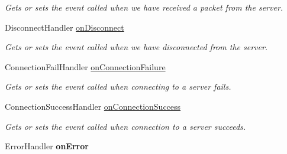 \begin{DoxyCompactItemize}
\begin{DoxyCompactList}\small\item\em Gets or sets the event called when we have received a packet from the server. \end{DoxyCompactList}\item 
\hypertarget{classSharpenguin_1_1PenguinBase_a11a9cb86a237e4aff2903c84cbc0d26f}{Disconnect\-Handler \hyperlink{classSharpenguin_1_1PenguinBase_a11a9cb86a237e4aff2903c84cbc0d26f}{on\-Disconnect}}\label{classSharpenguin_1_1PenguinBase_a11a9cb86a237e4aff2903c84cbc0d26f}

\begin{DoxyCompactList}\small\item\em Gets or sets the event called when we have disconnected from the server. \end{DoxyCompactList}\item 
\hypertarget{classSharpenguin_1_1PenguinBase_a405b654d1bbbc9bca815024fde3bfd14}{Connection\-Fail\-Handler \hyperlink{classSharpenguin_1_1PenguinBase_a405b654d1bbbc9bca815024fde3bfd14}{on\-Connection\-Failure}}\label{classSharpenguin_1_1PenguinBase_a405b654d1bbbc9bca815024fde3bfd14}

\begin{DoxyCompactList}\small\item\em Gets or sets the event called when connecting to a server fails. \end{DoxyCompactList}\item 
\hypertarget{classSharpenguin_1_1PenguinBase_a6739d15fdd9a00f22fdd031a7175938a}{Connection\-Success\-Handler \hyperlink{classSharpenguin_1_1PenguinBase_a6739d15fdd9a00f22fdd031a7175938a}{on\-Connection\-Success}}\label{classSharpenguin_1_1PenguinBase_a6739d15fdd9a00f22fdd031a7175938a}

\begin{DoxyCompactList}\small\item\em Gets or sets the event called when connection to a server succeeds. \end{DoxyCompactList}\item 
\hypertarget{classSharpenguin_1_1PenguinBase_a209b85204c8df77c0ea7a50ee298ccd2}{Error\-Handler {\bfseries on\-Error}}\label{classSharpenguin_1_1PenguinBase_a209b85204c8df77c0ea7a50ee298ccd2}


\end{DoxyCompactItemize}
